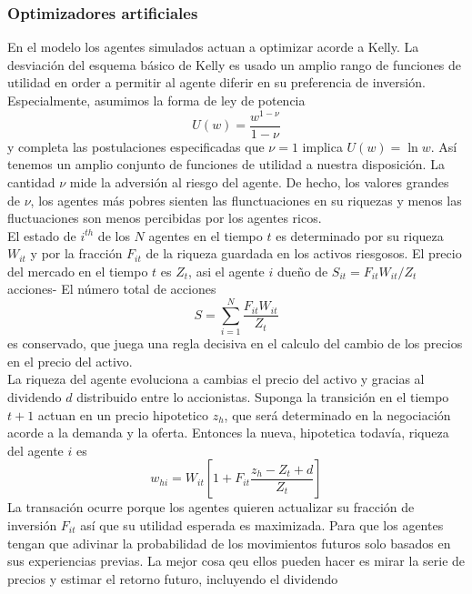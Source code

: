 \documentclass[12pt,a4paper]{article}
\begin{document}
\subsubsection*{Optimizadores artificiales}
\quad En el modelo los agentes simulados actuan a optimizar acorde a Kelly. La desviación del esquema básico de Kelly es usado un amplio rango de funciones de utilidad en order a permitir al agente diferir en su preferencia de inversión. Especialmente, asumimos la forma de ley de potencia
\begin{equation}
U(w)= \frac{w^{1-\nu}}{1-\nu}\label{4.47}
\end{equation}
y completa las postulaciones especificadas que $\nu = 1$ implica $U(w)=\ln w$. Así tenemos un amplio conjunto de funciones de utilidad a nuestra disposición. La cantidad $\nu$ mide la adversión al riesgo del agente. De hecho, los valores grandes de $\nu$, los agentes más pobres sienten las flunctuaciones en su riquezas y menos las fluctuaciones son menos percibidas por los agentes ricos.\\
\quad El estado de $i^{th}$ de los $N$ agentes en el tiempo $t$ es determinado por su riqueza $W_{it}$ y por la fracción $F_{it}$ de la riqueza guardada en los activos riesgosos. El precio del mercado en el tiempo $t$ es $Z_{t}$, asi el agente $i$ dueño de $S_{it}= F_{it}W_{it}/Z_t$ acciones- El número total de acciones
\begin{equation}
S=\sum_{i=1}^{N} \frac{F_{it}W_{it}}{Z_t}\label{4.48}
\end{equation} 
es conservado, que juega una regla decisiva en el calculo del cambio de los precios en el precio del activo.\\
\quad La riqueza del agente evoluciona a cambias el precio del activo y gracias al dividendo $d$ distribuido entre lo accionistas. Suponga la transición en el tiempo $t+1$ actuan en un precio hipotetico $z_h$, que será determinado en la negociación acorde a la demanda y la oferta. Entonces la nueva, hipotetica todavía, riqueza del agente $i$ es
\begin{equation}
w_{hi} = W_{it}\left[1+F_{it}\frac{z_h-Z_t+d}{Z_t}\right]\label{4.49}
\end{equation}  
La transación ocurre porque los agentes quieren actualizar su fracción de inversión $F_{it}$ así que su utilidad esperada es maximizada. Para que los agentes tengan que adivinar la probabilidad de los movimientos futuros solo basados en sus experiencias previas. La mejor cosa qeu ellos pueden hacer es mirar la serie de precios y estimar el retorno futuro, incluyendo el dividendo
\end{document}
